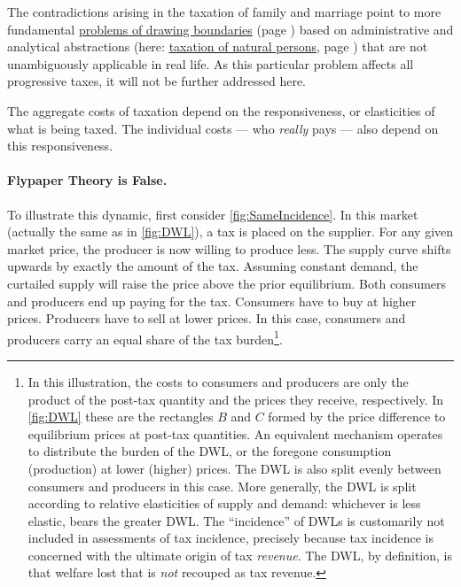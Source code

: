 The contradictions arising in the taxation of family and marriage point to more fundamental \href{sec:WorkPlay}{problems of drawing boundaries} (page \pageref{sec:WorkPlay}) based on administrative and analytical abstractions (here:
\hyperref[des:PersonalTaxation]{taxation of natural persons}, page \pageref{des:PersonalTaxation}) that are not unambiguously applicable in real life.
As this particular problem affects all progressive taxes, it will not be further addressed here.

 The aggregate costs of taxation depend on the responsiveness, or elasticities of what is being taxed.
The individual costs --- who \emph{really} pays --- also depend on this responsiveness.

\paragraph{Flypaper Theory is False.} To illustrate this dynamic, first consider \autoref{fig:SameIncidence}.
In this market (actually the same as in \autoref{fig:DWL}), a tax is placed on the supplier.
For any given market price, the producer is now willing to produce less.
The supply curve shifts upwards by exactly the amount of the tax.
Assuming constant demand, the curtailed supply will raise the price above the prior equilibrium.
Both consumers and producers end up paying for the tax.
Consumers have to buy at higher prices.
Producers have to sell at lower prices.
In this case, consumers and producers carry an equal share of the tax burden\footnote{
	In this illustration, the costs to consumers and producers are only the product of the post-tax quantity and the prices they receive, respectively.
In \autoref{fig:DWL} these are the rectangles $B$ and $C$ formed by the price difference to equilibrium prices at post-tax quantities.
An equivalent mechanism operates to distribute the burden of the DWL, or the foregone consumption (production) at lower (higher) prices.
The DWL is also split evenly between consumers and producers in this case.
More generally, the DWL is split according to relative elasticities of supply and demand:
whichever is less elastic, bears the greater DWL.
 The ``incidence'' of DWLs is customarily not included in assessments of tax incidence, precisely because tax incidence is concerned with the ultimate origin of tax \emph{revenue}.
The DWL, by definition, is that welfare lost that is \emph{not} recouped as tax revenue.}.


